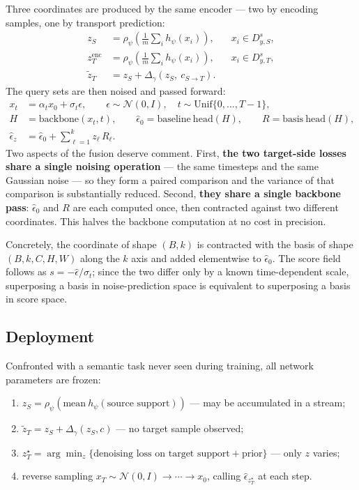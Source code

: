 \documentclass[11pt]{article}
\newcommand{\epshat}{\hat{\epsilon}}
\newcommand{\zS}{z_{S}}
\newcommand{\zencT}{z^{\mathrm{enc}}_{T}}
\newcommand{\ztilT}{\tilde{z}_{T}}
\newcommand{\zstarT}{z^{\star}_{T}}
\newcommand{\Dss}{D^{s}_{y,S}}
\newcommand{\Dst}{D^{s}_{y,T}}
\begin{document}
Three coordinates are produced by the same encoder --- two by encoding samples, one by transport
prediction:
\begin{align}
\zS      &= \rho_\psi\!\left(\tfrac{1}{m}\textstyle\sum_{i} h_\psi(x_i)\right), && x_i\in\Dss, \\
\zencT   &= \rho_\psi\!\left(\tfrac{1}{m}\textstyle\sum_{i} h_\psi(x_i)\right), && x_i\in\Dst, \\
\ztilT   &= \zS + \Delta_\gamma\!\left(\zS,\ c_{S\to T}\right). &&
\end{align}
The query sets are then noised and passed forward:
\begin{align}
x_t &= \alpha_t x_0 + \sigma_t \epsilon, \qquad \epsilon\sim\mathcal{N}(0,I),\quad t\sim\mathrm{Unif}\{0,\dots,T-1\},\\
H &= \mathrm{backbone}(x_t,t),\qquad \epshat_0 = \mathrm{baseline\ head}(H),\qquad R = \mathrm{basis\ head}(H),\\
\epshat_{z} &= \epshat_0 + \textstyle\sum_{\ell=1}^{k} z_\ell\,R_\ell .
\label{eq:fuse}
\end{align}
Two aspects of the fusion deserve comment. First, \textbf{the two target-side losses share a single
noising operation} --- the same timesteps and the same Gaussian noise --- so they form a paired
comparison and the variance of that comparison is substantially reduced. Second, \textbf{they share
a single backbone pass}: $\epshat_0$ and $R$ are each computed once, then contracted against two
different coordinates. This halves the backbone computation at no cost in precision.

Concretely, the coordinate of shape $(B,k)$ is contracted with the basis of shape
$(B,k,C,H,W)$ along the $k$ axis and added elementwise to $\epshat_0$. The score field follows as
$s=-\epshat/\sigma_t$; since the two differ only by a known time-dependent scale, superposing a
basis in noise-prediction space is equivalent to superposing a basis in score space.

\subsection{Deployment}

Confronted with a semantic task never seen during training, all network parameters are frozen:
\begin{enumerate}[leftmargin=2.2em, itemsep=2pt]
  \item $\zS=\rho_\psi\!\left(\mathrm{mean}\ h_\psi(\text{source support})\right)$ --- may be
        accumulated in a stream;
  \item $\ztilT=\zS+\Delta_\gamma(\zS,c)$ --- no target sample observed;
  \item $\zstarT=\arg\min_z\{\text{denoising loss on target support}+\text{prior}\}$ --- only $z$ varies;
  \item reverse sampling $x_T\sim\mathcal{N}(0,I)\to\cdots\to x_0$, calling $\epshat_{\zstarT}$ at each step.
\end{enumerate}
\end{document}
